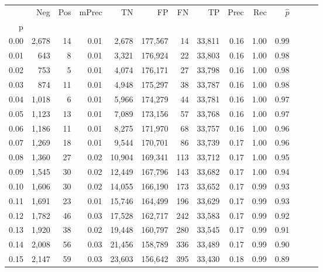 \begin{tabular}{rrrrrrrrrrrrrr}
\toprule
{} &    Neg &  Pos & mPrec &       TN &       FP &      FN &      TP &  Prec &   Rec & $\hat{p}$ \\
p    &        &      &       &          &          &         &         &       &       &           \\
\midrule
0.00 &  2,678 &   14 &  0.01 &    2,678 &  177,567 &      14 &  33,811 &  0.16 &  1.00 &      0.99 \\
0.01 &    643 &    8 &  0.01 &    3,321 &  176,924 &      22 &  33,803 &  0.16 &  1.00 &      0.98 \\
0.02 &    753 &    5 &  0.01 &    4,074 &  176,171 &      27 &  33,798 &  0.16 &  1.00 &      0.98 \\
0.03 &    874 &   11 &  0.01 &    4,948 &  175,297 &      38 &  33,787 &  0.16 &  1.00 &      0.98 \\
0.04 &  1,018 &    6 &  0.01 &    5,966 &  174,279 &      44 &  33,781 &  0.16 &  1.00 &      0.97 \\
0.05 &  1,123 &   13 &  0.01 &    7,089 &  173,156 &      57 &  33,768 &  0.16 &  1.00 &      0.97 \\
0.06 &  1,186 &   11 &  0.01 &    8,275 &  171,970 &      68 &  33,757 &  0.16 &  1.00 &      0.96 \\
0.07 &  1,269 &   18 &  0.01 &    9,544 &  170,701 &      86 &  33,739 &  0.17 &  1.00 &      0.96 \\
0.08 &  1,360 &   27 &  0.02 &   10,904 &  169,341 &     113 &  33,712 &  0.17 &  1.00 &      0.95 \\
0.09 &  1,545 &   30 &  0.02 &   12,449 &  167,796 &     143 &  33,682 &  0.17 &  1.00 &      0.94 \\
0.10 &  1,606 &   30 &  0.02 &   14,055 &  166,190 &     173 &  33,652 &  0.17 &  0.99 &      0.93 \\
0.11 &  1,691 &   23 &  0.01 &   15,746 &  164,499 &     196 &  33,629 &  0.17 &  0.99 &      0.93 \\
0.12 &  1,782 &   46 &  0.03 &   17,528 &  162,717 &     242 &  33,583 &  0.17 &  0.99 &      0.92 \\
0.13 &  1,920 &   38 &  0.02 &   19,448 &  160,797 &     280 &  33,545 &  0.17 &  0.99 &      0.91 \\
0.14 &  2,008 &   56 &  0.03 &   21,456 &  158,789 &     336 &  33,489 &  0.17 &  0.99 &      0.90 \\
0.15 &  2,147 &   59 &  0.03 &   23,603 &  156,642 &     395 &  33,430 &  0.18 &  0.99 &      0.89 \\

\end{tabular}
